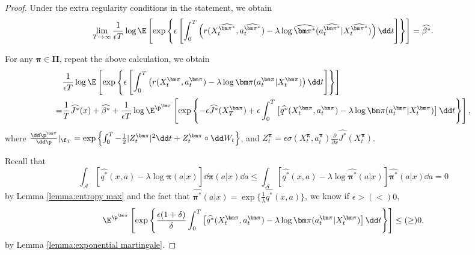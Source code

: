 \begin{proof}
Under the extra regularity conditions in the statement, we obtain 
\[ \lim_{T\to \infty}\frac{1}{\epsilon T} \log \E\left[ \exp\left\{ \epsilon\left[  \int_0^T \left(  r(X_t^{\widehat{\bm\pi^*}}, a_t^{\widehat{\bm\pi^*}}) -\lambda \log\widehat{\bm\pi^*}(a_t^{\widehat{\bm\pi^*}} | X_t^{\widehat{\bm\pi^*}})\right)\dd t \right]  \right\} \right] = \widehat{\beta^*} . \] 

For any $\bm\pi\in \bm\Pi$, repeat the above calculation, we obtain 
\[ \begin{aligned}
& \frac{1}{\epsilon T} \log \E\left[ \exp\left\{ \epsilon\left[  \int_0^T \left(  r(X_t^{\bm\pi}, a_t^{\bm\pi}) -\lambda \log\bm\pi(a_t^{\bm\pi} | X_t^{\bm\pi})\right)\dd t \right]  \right\} \right] \\
=& \frac{1}{T} \widehat{J^*}(x) + \widehat{\beta^*} + \frac{1}{\epsilon T} \log \E^{\p^{\bm\pi}}\left[ \exp\left\{ -\epsilon \widehat{J^*}(X_T^{\bm\pi}) + \epsilon \int_0^T \left[ \widehat{q^*}(X_t^{\bm\pi}, a_t^{\bm\pi}) - \lambda\log\bm\pi(a_t^{\bm\pi} | X_t^{\bm\pi}) \right] \dd t \right\}  \right],
\end{aligned}  \]
where $\frac{\dd\p^{\bm\pi}}{\dd \p}|_{\f_T} = \exp\left\{  \int_0^T - \frac{1}{2}|Z_t^{\bm\pi}|^2  \dd t + Z_t^{\bm\pi} \circ \dd W_t  \right\}$, and $Z_t^{\bm\pi} =  \epsilon \sigma(X_t^{\bm\pi},a_t^{\bm\pi}) \frac{\partial }{\partial x}\widehat{J^*}(X_t^{\bm\pi})$.

Recall that 
\[ \int_{\mathcal A} \left[ \widehat{q^*}(x,a) - \lambda\log\bm\pi(a|x) \right]\dd \bm\pi(a|x)\dd a \leq \int_{\mathcal A} \left[ \widehat{q^*}(x,a) - \lambda\log\widehat{\bm\pi^*}(a|x) \right]\widehat{\bm\pi^*}(a|x) \dd  a = 0 \]
by Lemma \ref{lemma:entropy max} and the fact that $\widehat{\bm\pi^*}(a|x) = \exp\{  \frac{1}{\lambda}\widehat{q^*}(x,a) \}$, we know if $\epsilon > (<) 0$,
\[ \E^{\p^{\bm\pi}}\left[ \exp\left\{  \frac{\epsilon( 1+\delta)}{\delta} \int_0^T \left[ \widehat{q^*}(X_t^{\bm\pi}, a_t^{\bm\pi}) - \lambda\log\bm\pi(a_t^{\bm\pi} | X_t^{\bm\pi}) \right] \dd t \right\}  \right] \leq (\geq) 0 ,\]
by Lemma \ref{lemma:exponential martingale}.


\end{proof}
